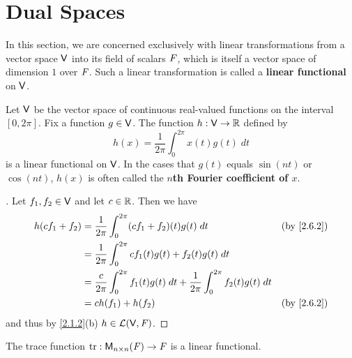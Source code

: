 \section{Dual Spaces}\label{sec:2.6}

\begin{defn}\label{2.6.1}
  In this section, we are concerned exclusively with linear transformations from a vector space \(\mathsf{V}\) into its field of scalars \(\mathit{F}\), which is itself a vector space of dimension \(1\) over \(\mathit{F}\).
  Such a linear transformation is called a \textbf{linear functional} on \(\mathsf{V}\).
\end{defn}

\begin{eg}\label{2.6.2}
  Let \(\mathsf{V}\) be the vector space of continuous real-valued functions on the interval \([0, 2\pi]\).
  Fix a function \(g \in \mathsf{V}\).
  The function \(h : \mathsf{V} \to \mathbb{R}\) defined by
  \[
    h(x) = \frac{1}{2\pi} \int_{0}^{2\pi} x(t) g(t) \; dt
  \]
  is a linear functional on \(\mathsf{V}\).
  In the cases that \(g(t)\) equals \(\sin(nt)\) or \(\cos(nt)\), \(h(x)\) is often called the \textbf{\(n\)th Fourier coefficient of \(x\)}.
\end{eg}

\begin{proof}[]
  Let \(f_1, f_2 \in \mathsf{V}\) and let \(c \in \mathbb{R}\).
  Then we have
  \begin{align*}
    h(cf_1 + f_2) & = \frac{1}{2\pi} \int_{0}^{2\pi} (cf_1 + f_2)(t) g(t) \; dt                                           &  & \text{(by \cref{2.6.2})} \\
                  & = \frac{1}{2\pi} \int_{0}^{2\pi} cf_1(t) g(t) + f_2(t) g(t) \; dt                                                                   \\
                  & = \frac{c}{2\pi} \int_{0}^{2\pi} f_1(t) g(t) \; dt + \frac{1}{2\pi} \int_{0}^{2\pi} f_2(t) g(t) \; dt                               \\
                  & = c h(f_1) + h(f_2)                                                                                   &  & \text{(by \cref{2.6.2})}
  \end{align*}
  and thus by \cref{2.1.2}(b) \(h \in \mathcal{L}(\mathsf{V}, \mathit{F})\).
\end{proof}

\begin{eg}\label{2.6.3}
  The trace function \(\tr : \ms{n}{n}{\F} \to \F\) is a linear functional.
\end{eg}

